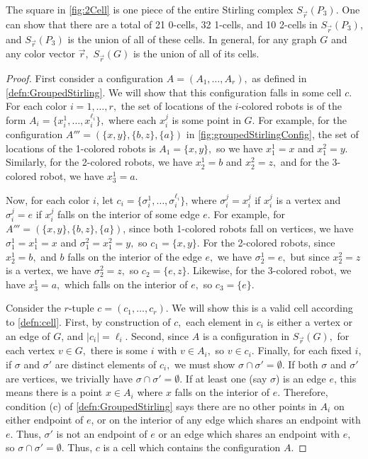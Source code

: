 \documentclass{amsart}
\newcommand{\Sr}{S_{\vec{r}}}
\newtheorem{prop}[thm]{Proposition}
\theoremstyle{definition}
\theoremstyle{remark}
\begin{document}
The square in \cref{fig:2Cell} is one piece of the entire Stirling complex $\Sr(P_3).$ One can show that there are a total of 21 0-cells, 32 1-cells, and 10 2-cells in $\Sr(P_3)$, and $\Sr(P_3)$ is the union of all of these cells. In general, for any graph $G$ and any color vector $\vec r,$ $\Sr(G)$ is the union of all of its cells.


\begin{proof}
    First consider a configuration $A=(A_1,\dots,A_r),$ as defined in \cref{defn:GroupedStirling}. We will show that this configuration falls in some cell $c.$ For each color $i=1,\dots,r,$ the set of locations of the $i$-colored robots is of the form $A_i=\{x^1_i,\dots,x_i^{\ell_i}\},$ where each $x_i^j$ is some point in $G$. For example, for the configuration $A'''=(\{x,y\},\{b,z\},\{a\})$ in \cref{fig:groupedStirlingConfig}, the set of locations of the 1-colored robots is $A_1=\{x,y\},$ so we have $x_1^1=x$ and $x_1^2=y.$ Similarly, for the 2-colored robots, we have $x_2^1=b$ and $x_2^2=z,$ and for the 3-colored robot, we have $x_3^1=a.$ 
    
    Now, for each color $i$, let $c_i=\{\sigma_i^1,\dots,\sigma_i^{\ell_i}\}$, where $\sigma_i^j=x_i^j$ if $x_i^j$ is a vertex and $\sigma_i^j=e$ if $x_i^j$ falls on the interior of some edge $e.$ For example, for $A'''=(\{x,y\},\{b,z\},\{a\})$, since both 1-colored robots fall on vertices, we have $\sigma_1^1=x_1^1=x$ and $\sigma_1^2=x_1^2=y,$ so $c_1=\{x,y\}.$ For the 2-colored robots, since $x_2^1=b,$ and $b$ falls on the interior of the edge $e,$ we have $\sigma_2^1=e,$ but since $x_2^2=z$ is a vertex, we have $\sigma_2^2=z,$ so $c_2=\{e,z\}.$ Likewise, for the 3-colored robot, we have $x_3^1=a,$ which falls on the interior of $e,$ so $c_3=\{e\}.$

    Consider the $r$-tuple $c=(c_1,\dots,c_r).$ We will show this is a valid cell according to \cref{defn:cell}. First, by construction of $c,$ each element in $c_i$ is either a vertex or an edge of $G$, and $|c_i|=\ell_i$. Second, since $A$ is a configuration in $\Sr(G),$ for each vertex $v\in G,$ there is some $i$ with $v\in A_i,$ so $v\in c_i.$ Finally, for each fixed $i$, if $\sigma$ and $ \sigma'$ are distinct elements of $c_i,$ we must show $\sigma\cap\sigma'=\emptyset.$ If both $\sigma$ and $\sigma'$ are vertices, we trivially have $\sigma\cap\sigma'=\emptyset$. If at least one (say $\sigma$) is an edge $e$, this means there is a point $x\in A_i$ where $x$ falls on the interior of $e.$ Therefore, condition (c) of \cref{defn:GroupedStirling} says there are no other points in $A_i$ on either endpoint of $e$, or on the interior of any edge which shares an endpoint with $e.$ Thus, $\sigma'$ is not an endpoint of $e$ or an edge which shares an endpoint with $e,$ so $\sigma\cap \sigma'=\emptyset.$ Thus, $c$ is a cell which contains the configuration $A$.


\end{proof}
\end{document}
